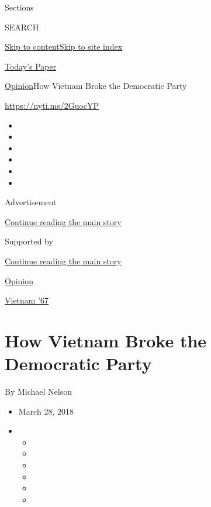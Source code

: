 Sections

SEARCH

\protect\hyperlink{site-content}{Skip to
content}\protect\hyperlink{site-index}{Skip to site index}

\href{https://myaccount.nytimes.com/auth/login?response_type=cookie\&client_id=vi}{}

\href{https://www.nytimes.com/section/todayspaper}{Today's Paper}

\href{/section/opinion}{Opinion}\textbar{}How Vietnam Broke the
Democratic Party

\href{https://nyti.ms/2GuocYP}{https://nyti.ms/2GuocYP}

\begin{itemize}
\item
\item
\item
\item
\item
\item
\end{itemize}

Advertisement

\protect\hyperlink{after-top}{Continue reading the main story}

Supported by

\protect\hyperlink{after-sponsor}{Continue reading the main story}

\href{/section/opinion}{Opinion}

\href{/column/vietnam-67}{Vietnam '67}

\hypertarget{how-vietnam-broke-the-democratic-party}{%
\section{How Vietnam Broke the Democratic
Party}\label{how-vietnam-broke-the-democratic-party}}

By Michael Nelson

\begin{itemize}
\item
  March 28, 2018
\item
  \begin{itemize}
  \item
  \item
  \item
  \item
  \item
  \item
  \end{itemize}
\end{itemize}

